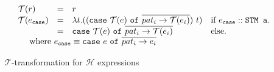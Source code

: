 \documentclass[submission,copyright,creativecommons]{eptcs}
\newcommand{\code}[1]{\textrm{{\tt #1}}}
\newcommand{\caseof}[2]{\code{case} \ #1 \ \code{of} \ #2 }
\newcommand{\pt}{\ensuremath{\mathcal{T}}}
\begin{document}
\begin{figure*}[t]
\begin{math}
\begin{array}{lllllll}
     &  \pt(r)                & = & r \\
     & \pt( e_{\mathtt{case}}) & = & \multicolumn{2}{l}{\lambda t . ((\caseof{\pt(e)}{\overline{pat_i -> \pt(e_i)}}) \ t)} & \multicolumn{2}{l}{\mbox{if  $e_{\mathtt{case}} :: \code{STM a}$.}}\\
     &                       & = & \multicolumn{2}{l}{\caseof{\pt(e)}{\overline{pat_i -> \pt(e_i)}}} & \multicolumn{2}{l}{\mbox{else.}}\\
     &                        \multicolumn{3}{l}{\ \ \ \ \mbox{where } e_{\mathtt{case}} \equiv\caseof{e}{\overline{pat_i -> e_i}} } 
\end{array}
  \end{math}\caption{$\pt$-transformation for $\mathcal{H}$ expressions}
  \label{fig:pt}
\end{figure*}
\end{document}
